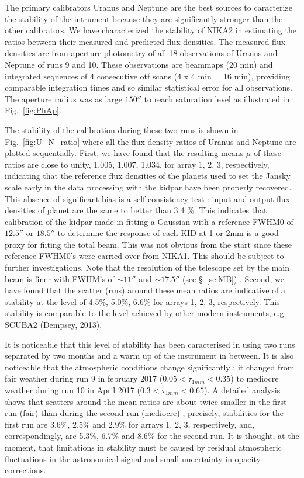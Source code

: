 The primary calibrators Uranus and Neptune are the best sources to caracterize the stability of the intrument
because they are significantly stronger than the other calibrators.
We have characterized the stability of NIKA2  in estimating the ratios between their measured 
and predicted flux densities. The measured flux densities are from aperture photometry of all
18 observations  of Uranus and Neptune of runs 9 and 10. These observations are   beammaps  (20 min) and integrated sequences of 
4 consecutive otf scans  (4 x 4 min = 16 min), providing  comparable integration times and so similar statistical error for all observations.
The aperture radius was as large $150''$ to reach saturation level
as illustrated in Fig.~\ref{fig:PhAp}. 

The stability of the calibration during these two runs 
is shown  in  Fig.~\ref{fig:U_N_ratio}  where all the flux density ratios of Uranus and Neptune are
plotted sequentially.
First, we have found that the resulting means $\mu$ of these ratios are close to unity,  1.005, 1.007, 1.034, for array 1, 2, 3, respectively,
indicating that the  reference flux densities of the planets used to set the Jansky scale 
early in the data processing with the kidpar have been properly
recovered. This absence of significant bias is a  self-consistency test : 
input and output flux densities of planet are the same to better than 3.4 \%. 
This indicates that calibration of  the kidpar  made in
fitting a Gaussian with a reference FWHM0 of $12.5''$ or $18.5''$ 
to determine the response of each KID at 1 or 2mm is a good proxy for
fiiting the total beam. This was not obvious from the start since these
reference FWHM0's were carried over from NIKA1. This should be subject
to further investigations. Note that the resolution of the telescope set by the main
beam is finer with FWHM's of $\sim 11''$ and $\sim 17.5''$ (see
\S~\ref{se:MB}) .
Second, we have found  that  the scatter (rms) around these mean ratios are indicative of
a stability at the level of 4.5\%, 5.0\%, 6.6\% for arrays 1, 2, 3,
respectively. This stability is comparable to the level achieved by other modern instruments,
e.g. SCUBA2 (Dempsey, 2013).

It is noticeable that this level of stability has been caracterised  in using two runs
separated by two months and  a warm up of the instrument in between. It is also noticeable that the
atmospheric conditions change significantly ; it changed from fair weather during run 9 in february 2017
($0.05 < \tau_{1mm} < 0.35$) to mediocre weather during run 10 in April 2017 ($0.3 < \tau_{1mm} < 0.65$). 
A detailed analysis shows that scatters around the  mean ratios 
are about twice smaller in the first run (fair) than during the second run (mediocre) ;
precisely, stabilities for the first run
are 3.6\%, 2.5\% and 2.9\% for arrays 1, 2, 3, respectively,
and, correspondingly,  are  5.3\%, 6.7\% and 8.6\% for the second run.
It is thought, at the moment, that limitations in stability must be  caused by residual atmospheric fluctuations
in the astronomical signal and small uncertainty in opacity corrections.

